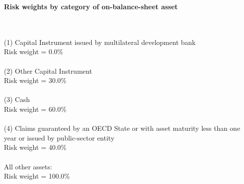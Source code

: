 \documentclass{article}
\begin{document}
\setlength{\parindent}{0em}
\begin{center}{\bf Risk weights by category of on-balance-sheet asset}\end{center}
~\\
~\\

(1) Capital Instrument issued by multilateral development bank \\
Risk weight = 0.0\%\\

~\\
(2) Other Capital Instrument\\
Risk weight = 30.0\%\\

~\\
(3) Cash \\
Risk weight = 60.0\%\\

~\\
(4) Claims guaranteed by an OECD State or with asset maturity less than one year or issued by public-sector entity \\
Risk weight = 40.0\%\\

~\\
All other assets:\\
Risk weight = 100.0\%\\

~\\
\end{document}
